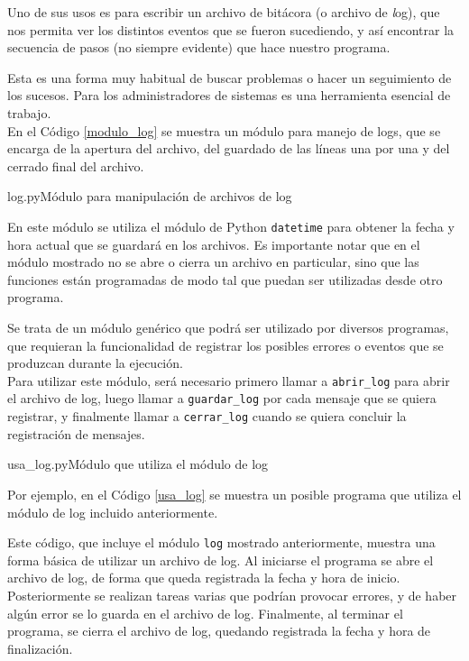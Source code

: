 Uno de sus usos es para escribir un archivo de bitácora (o archivo de
{\textit log}), que nos permita ver los distintos eventos que se fueron
sucediendo, y así encontrar la secuencia de pasos (no siempre evidente) que
hace nuestro programa.

Esta es una forma muy habitual de buscar problemas o hacer un seguimiento
de los sucesos. Para los administradores de sistemas es una herramienta
esencial de trabajo. \\

En el Código \ref{modulo_log} se muestra un módulo para manejo de logs, que
se encarga de la apertura del archivo, del guardado de las líneas una por
una y del cerrado final del archivo.

\begin{codigo}{log.py}{Módulo para manipulación de archivos de log}
\label{modulo_log}

\end{codigo}

En este módulo se utiliza el módulo de Python \lstinline!datetime! para
obtener la fecha y hora actual que se guardará en los archivos.  Es
importante notar que en el módulo mostrado no se abre o cierra un archivo
en particular, sino que las funciones están programadas de modo tal que
puedan ser utilizadas desde otro programa.

Se trata de un módulo genérico que podrá ser utilizado por diversos programas,
que requieran la funcionalidad de registrar los posibles errores o eventos que
se produzcan durante la ejecución. \\

Para utilizar este módulo, será necesario primero llamar a
\lstinline!abrir_log! para abrir el archivo de log, luego llamar a
\lstinline!guardar_log! por cada mensaje que se quiera registrar, y
finalmente llamar a \lstinline!cerrar_log! cuando se quiera concluir la
registración de mensajes. \\

\begin{codigo}{usa\_log.py}{Módulo que utiliza el módulo de log}
\label{usa_log}

\end{codigo}

Por ejemplo, en el Código \ref{usa_log} se muestra un posible programa que
utiliza el módulo de log incluido anteriormente.

Este código, que incluye el módulo \lstinline!log! mostrado anteriormente,
muestra una forma básica de utilizar un archivo de log.  Al iniciarse el
programa se abre el archivo de log, de forma que queda registrada la fecha
y hora de inicio.  Posteriormente se realizan tareas varias que podrían
provocar errores, y de haber algún error se lo guarda en el archivo de log.
Finalmente, al terminar el programa, se cierra el archivo de log, quedando
registrada la fecha y hora de finalización.

